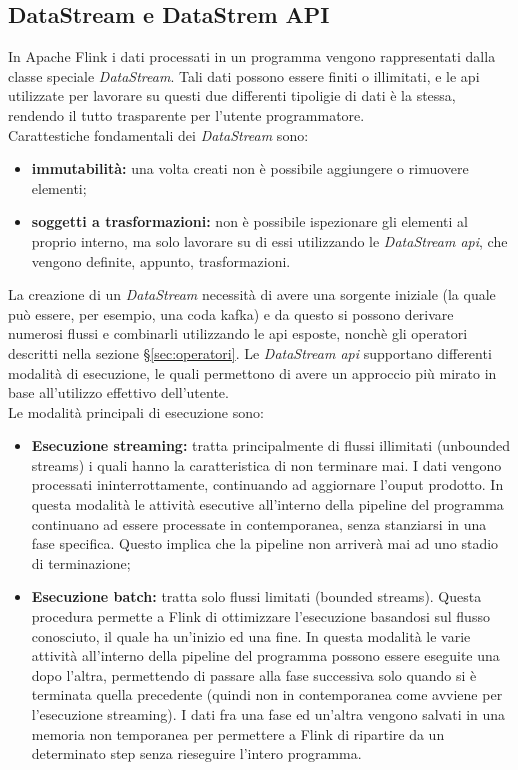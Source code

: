 \subsection{DataStream e DataStrem API}
In Apache Flink i dati processati in un programma vengono rappresentati dalla classe speciale \textit{DataStream}.
Tali dati possono essere finiti o illimitati, e le \gls{api} utilizzate per lavorare su questi due differenti tipoligie di dati è la stessa, rendendo il tutto trasparente per l'utente programmatore.\\
Carattestiche fondamentali dei \textit{DataStream} sono:
\begin{itemize}
	\item{\textbf{immutabilità:} una volta creati non è possibile aggiungere o rimuovere elementi;}
	\item{\textbf{soggetti a trasformazioni:} non è possibile ispezionare gli elementi al proprio interno, ma solo lavorare su di essi utilizzando le \textit{DataStream \gls{api}}, che vengono definite, appunto, trasformazioni.}
\end{itemize}
La creazione di un \textit{DataStream} necessità di avere una sorgente iniziale (la quale può essere, per esempio, una coda \gls{kafka}) e da questo si possono derivare numerosi flussi e combinarli utilizzando le \gls{api} esposte, nonchè gli operatori descritti nella sezione \S\ref{sec:operatori}.
Le \textit{DataStream \gls{api}} supportano differenti modalità di esecuzione, le quali permettono di avere un approccio più mirato in base all'utilizzo effettivo dell'utente.\\
Le modalità principali di esecuzione sono:
\begin{itemize}
	\item{\textbf{Esecuzione streaming:} tratta principalmente di flussi illimitati (\gls{unbounded streams}) i quali hanno la caratteristica di non terminare mai. I dati vengono processati ininterrottamente, continuando ad aggiornare l'ouput prodotto. In questa modalità le attività esecutive all'interno della \gls{pipeline} del programma continuano ad essere processate in contemporanea, senza stanziarsi in una fase specifica. Questo implica che la \gls{pipeline} non arriverà mai ad uno stadio di terminazione;}
	\item{\textbf{Esecuzione batch:} tratta solo flussi limitati (\gls{bounded streams}). Questa procedura permette a Flink di ottimizzare l'esecuzione basandosi sul flusso conosciuto, il quale ha un'inizio ed una fine. In questa modalità le varie attività all'interno della \gls{pipeline} del programma possono essere eseguite una dopo l'altra, permettendo di passare alla fase successiva solo quando si è terminata quella precedente (quindi non in contemporanea come avviene per l'esecuzione streaming). I dati fra una fase ed un'altra vengono salvati in una memoria non temporanea per permettere a Flink di ripartire da un determinato step senza rieseguire l'intero programma.}
\end{itemize}

